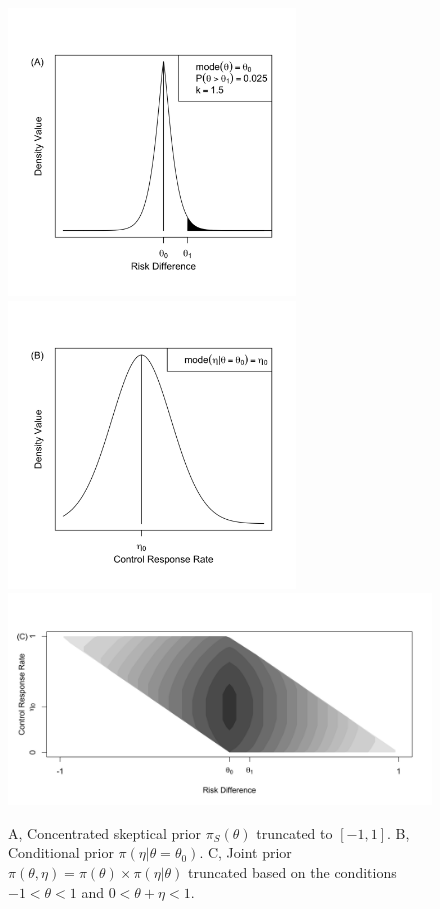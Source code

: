 \documentclass[12pt]{article}
\begin{document}
\begin{figure}[htbp]
\begin{center}
\includegraphics[width=3in]{./figures/figure5a_NEW.png}
\includegraphics[width=3in]{./figures/figure5b_NEW.png}
\includegraphics[width=6in]{./figures/figure5a.png}
\caption{A, Concentrated skeptical prior $\pi_S(\theta)$ truncated to $[-1,1]$. B, Conditional prior $\pi(\eta|\theta=\theta_0)$. C, Joint prior $\pi(\theta,\eta)=\pi(\theta)\times\pi(\eta|\theta)$ truncated based on the conditions $-1<\theta<1$ and $0<\theta+\eta<1$.}
\label{fig:figure5}
 \end{center}
\end{figure}
\end{document}
